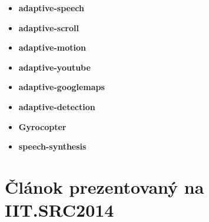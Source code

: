 \begin{itemize}
  \item \textbf{adaptive-speech}
  \item \textbf{adaptive-scroll}
  \item \textbf{adaptive-motion}
  \item \textbf{adaptive-youtube}
  \item \textbf{adaptive-googlemaps}
  \item \textbf{adaptive-detection}
  \item \textbf{Gyrocopter}
  \item \textbf{speech-synthesis}
\end{itemize}

\newpage












\newpage
\section{Článok prezentovaný na IIT.SRC2014} %
\label{sec:_l_nok_prezentovan_na_iit_src2014}



